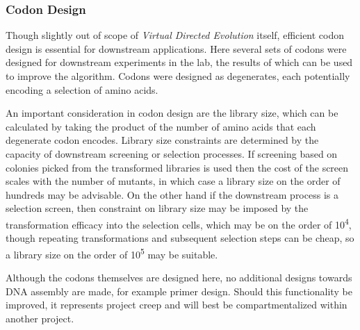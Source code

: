 \documentclass[16pt]{book}
\begin{document}
\subsubsection{Codon Design}

Though slightly out of scope of \textit{Virtual Directed Evolution} itself, efficient codon design is essential for downstream applications.
Here several sets of codons were designed for downstream experiments in the lab, the results of which can be used to improve the algorithm.
Codons were designed as degenerates, each potentially encoding a selection of amino acids.

An important consideration in codon design are the library size, which can be calculated by taking the product of the number of amino acids that each degenerate codon  encodes.
Library size constraints are determined by the capacity of downstream screening or selection processes.
If screening based on colonies picked from the transformed libraries is used then the cost of the screen scales with the number of mutants, in which case a library size on the order of hundreds may be advisable.
On the other hand if the downstream process is a selection screen, then constraint on library size may be imposed by the transformation efficacy into the selection cells, which may be on the order of 10\textsuperscript{4}, though repeating transformations and subsequent selection steps can be cheap, so a library size on the order of 10\textsuperscript{5} may be suitable.

Although the codons themselves are designed here, no additional designs towards DNA assembly are made, for example primer design.
Should this functionality be improved, it represents project creep and will best be compartmentalized within another project.

\printbibliography
\end{document}
